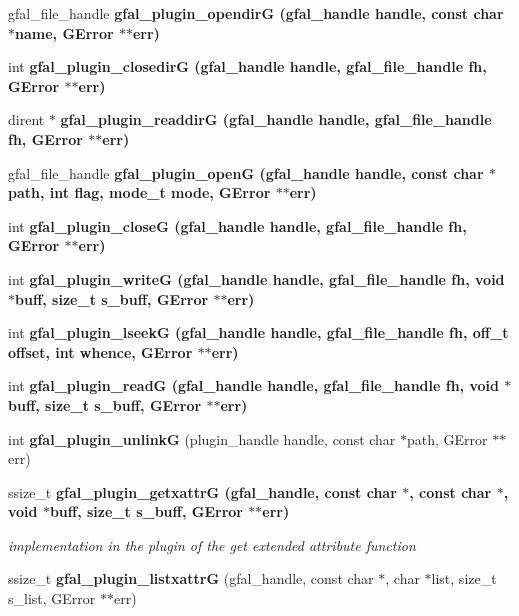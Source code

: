 \begin{CompactItemize}
gfal\_\-file\_\-handle \bf{gfal\_\-plugin\_\-opendir\-G} (gfal\_\-handle handle, const char $\ast$name, GError $\ast$$\ast$err)
\item 
int \bf{gfal\_\-plugin\_\-closedir\-G} (gfal\_\-handle handle, gfal\_\-file\_\-handle fh, GError $\ast$$\ast$err)
\item 
dirent $\ast$ \bf{gfal\_\-plugin\_\-readdir\-G} (gfal\_\-handle handle, gfal\_\-file\_\-handle fh, GError $\ast$$\ast$err)
\item 
gfal\_\-file\_\-handle \bf{gfal\_\-plugin\_\-open\-G} (gfal\_\-handle handle, const char $\ast$path, int flag, mode\_\-t mode, GError $\ast$$\ast$err)
\item 
int \bf{gfal\_\-plugin\_\-close\-G} (gfal\_\-handle handle, gfal\_\-file\_\-handle fh, GError $\ast$$\ast$err)
\item 
int \bf{gfal\_\-plugin\_\-write\-G} (gfal\_\-handle handle, gfal\_\-file\_\-handle fh, void $\ast$buff, size\_\-t s\_\-buff, GError $\ast$$\ast$err)
\item 
int \bf{gfal\_\-plugin\_\-lseek\-G} (gfal\_\-handle handle, gfal\_\-file\_\-handle fh, off\_\-t offset, int whence, GError $\ast$$\ast$err)
\item 
int \bf{gfal\_\-plugin\_\-read\-G} (gfal\_\-handle handle, gfal\_\-file\_\-handle fh, void $\ast$buff, size\_\-t s\_\-buff, GError $\ast$$\ast$err)
\item 
int \textbf{gfal\_\-plugin\_\-unlink\-G} (plugin\_\-handle handle, const char $\ast$path, GError $\ast$$\ast$err)\label{gfal__common__plugin_8h_23ee550b9dd10a5561e6c9c233fb621f}

\item 
ssize\_\-t \bf{gfal\_\-plugin\_\-getxattr\-G} (gfal\_\-handle, const char $\ast$, const char $\ast$, void $\ast$buff, size\_\-t s\_\-buff, GError $\ast$$\ast$err)\label{gfal__common__plugin_8h_e67fef2ab537815ac8ed072b179f9e67}

\begin{CompactList}\small\item\em implementation in the plugin of the get extended attribute function \item\end{CompactList}\item 
ssize\_\-t \textbf{gfal\_\-plugin\_\-listxattr\-G} (gfal\_\-handle, const char $\ast$, char $\ast$list, size\_\-t s\_\-list, GError $\ast$$\ast$err)\label{gfal__common__plugin_8h_b91265adebaddf5ca37245a0f971a303}

\end{CompactItemize}


